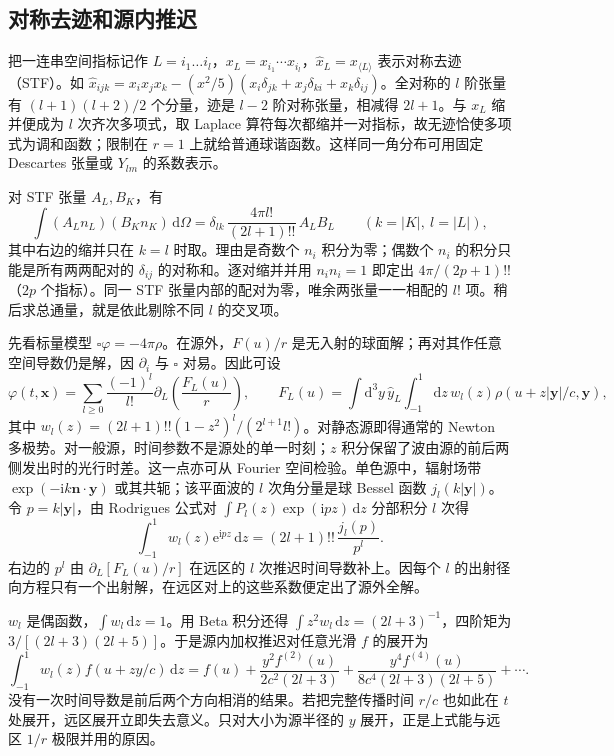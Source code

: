 \subsection{对称去迹和源内推迟}

把一连串空间指标记作 $L=i_1\ldots i_l$，$x_L=x_{i_1}\cdots x_{i_l}$，$\hat x_L=x_{\langle L\rangle}$ 表示对称去迹（STF）。如 $\hat x_{ijk}=x_ix_jx_k-(x^2/5)(x_i\delta_{jk}+x_j\delta_{ki}+x_k\delta_{ij})$。全对称的 $l$ 阶张量有 $(l+1)(l+2)/2$ 个分量，迹是 $l-2$ 阶对称张量，相减得 $2l+1$。与 $x_L$ 缩并便成为 $l$ 次齐次多项式，取 Laplace 算符每次都缩并一对指标，故无迹恰使多项式为调和函数；限制在 $r=1$ 上就给普通球谐函数。这样同一角分布可用固定 Descartes 张量或 $Y_{lm}$ 的系数表示。

对 STF 张量 $A_L,B_K$，有
\[
 \int (A_Ln_L)(B_Kn_K)\,\mathrm d\Omega
 =\delta_{lk}\,\frac{4\pi l!}{(2l+1)!!}\, A_L B_L
 \qquad (k=|K|,\ l=|L|),
\]
其中右边的缩并只在 $k=l$ 时取。理由是奇数个 $n_i$ 积分为零；偶数个 $n_i$ 的积分只能是所有两两配对的 $\delta_{ij}$ 的对称和。逐对缩并并用 $n_i n_i=1$ 即定出 $4\pi/(2p+1)!!$（$2p$ 个指标）。同一 STF 张量内部的配对为零，唯余两张量一一相配的 $l!$ 项。稍后求总通量，就是依此剔除不同 $l$ 的交叉项。

先看标量模型 $\square\varphi=-4\pi\rho$。在源外，$F(u)/r$ 是无入射的球面解；再对其作任意空间导数仍是解，因 $\partial_i$ 与 $\square$ 对易。因此可设
\begin{equation}
 \varphi(t,\bm x)=\sum_{l\ge0}\frac{(-1)^l}{l!}
       \partial_L\!\left(\frac{F_L(u)}{r}\right),\qquad
 F_L(u)=\int \mathrm d^3y\,\hat y_L\!\int_{-1}^{1}\mathrm dz\,
       w_l(z)\rho(u+z|\bm y|/c,\bm y) ,
 \label{eq:gw-a-stf-ret}
\end{equation}
其中 $w_l(z)=(2l+1)!!(1-z^2)^l/(2^{l+1}l!)$。对静态源即得通常的 Newton 多极势。对一般源，时间参数不是源处的单一时刻；$z$ 积分保留了波由源的前后两侧发出时的光行时差。这一点亦可从 Fourier 空间检验。单色源中，辐射场带 $\exp(-\mathrm i k\bm n\cdot\bm y)$ 或其共轭；该平面波的 $l$ 次角分量是球 Bessel 函数 $j_l(k|\bm y|)$。令 $p=k|\bm y|$，由 Rodrigues 公式对 $\int P_l(z)\exp(\mathrm i p z)\,\mathrm dz$ 分部积分 $l$ 次得
\[
 \int_{-1}^{1}w_l(z)\mathrm e^{\mathrm i pz}\,\mathrm dz
       =(2l+1)!!\,\frac{j_l(p)}{p^l}.
\]
右边的 $p^l$ 由 $\partial_L[F_L(u)/r]$ 在远区的 $l$ 次推迟时间导数补上。因每个 $l$ 的出射径向方程只有一个出射解，在远区对上的这些系数便定出了源外全解。

$w_l$ 是偶函数，$\int w_l\,\mathrm dz=1$。用 Beta 积分还得 $\int z^2w_l\,\mathrm dz=(2l+3)^{-1}$，四阶矩为 $3/[(2l+3)(2l+5)]$。于是源内加权推迟对任意光滑 $f$ 的展开为
\[
 \int_{-1}^1 w_l(z)f(u+zy/c)\,\mathrm dz
 =f(u)+\frac{y^2f^{(2)}(u)}{2c^2(2l+3)}
    +\frac{y^4f^{(4)}(u)}{8c^4(2l+3)(2l+5)}+\cdots .
\]
没有一次时间导数是前后两个方向相消的结果。若把完整传播时间 $r/c$ 也如此在 $t$ 处展开，远区展开立即失去意义。只对大小为源半径的 $y$ 展开，正是上式能与远区 $1/r$ 极限并用的原因。

